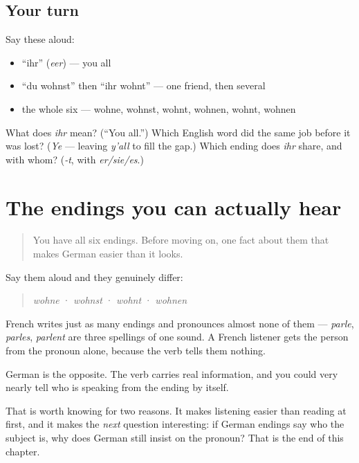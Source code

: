 \subsection*{Your turn}
Say these aloud:

\begin{itemize}
\raggedright
  \item \textquotedblleft{}ihr\textquotedblright{} (\emph{eer}) — you all
  \item \textquotedblleft{}du wohnst\textquotedblright{} then \textquotedblleft{}ihr wohnt\textquotedblright{} — one friend, then several
  \item the whole six — wohne, wohnst, wohnt, wohnen, wohnt, wohnen
\end{itemize}

\begin{tcolorbox}[breakable,colback=teal!4,colframe=teal!35!black,title={Before you move on}]
What does \emph{ihr} mean? (\textquotedblleft{}You all.\textquotedblright{}) Which English word did the same job before it was lost? (\emph{Ye} — leaving \emph{y'all} to fill the gap.) Which ending does \emph{ihr} share, and with whom? (\emph{-t}, with \emph{er/sie/es}.)
\end{tcolorbox}
\section[(the audible endings)]{The endings you can actually hear}

\label{lesson:GE-C05-endungen-hoerbar}



\begin{quote}
You have all six endings. Before moving on, one fact about them that makes German easier than it looks.
\end{quote}

\begin{grammarlens}[title={Grammar Lens: German endings are audible}]
Say them aloud and they genuinely differ:

\begin{quote}
\emph{wohne} · \emph{wohnst} · \emph{wohnt} · \emph{wohnen}
\end{quote}

French writes just as many endings and pronounces almost none of them — \emph{parle}, \emph{parles}, \emph{parlent} are three spellings of one sound. A French listener gets the person from the pronoun alone, because the verb tells them nothing.

German is the opposite. The verb carries real information, and you could very nearly tell who is speaking from the ending by itself.

That is worth knowing for two reasons. It makes listening easier than reading at first, and it makes the \emph{next} question interesting: if German endings say who the subject is, why does German still insist on the pronoun? That is the end of this chapter.
\end{grammarlens}

